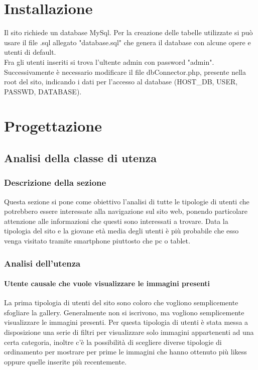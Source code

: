 \documentclass[openany, a4paper, 12pt]{report}
\begin{document}
	\chapter{Installazione}
	Il sito richiede un database MySql. Per la creazione delle tabelle utilizzate si può usare il file .sql allegato "database.sql" che genera il database con alcune opere e utenti di default.\\
	Fra gli utenti inseriti si trova l'ultente admin con password "admin".
	Successivamente è necessario modificare il file dbConnector.php, presente nella root del sito, indicando i dati per l'accesso al database (HOST\_DB, USER, PASSWD, DATABASE).\\
	
	\chapter{Progettazione}

	\section{Analisi della classe di utenza}

		\subsection{Descrizione della sezione}
		Questa sezione si pone come obiettivo l'analisi di tutte le tipologie di utenti che potrebbero essere interessate alla navigazione sul sito web, ponendo particolare attenzione alle informazioni che questi sono interessati a trovare. Data la tipologia del sito e la giovane età media degli utenti è più probabile che esso venga visitato tramite smartphone piuttosto che pc o tablet.\\
		\subsection{Analisi dell'utenza}
		\subsubsection{Utente causale che vuole visualizzare le immagini presenti}
		La prima tipologia di utenti del sito sono coloro che vogliono semplicemente sfogliare la gallery. Generalmente non si iscrivono, ma vogliono semplicemente visualizzare le immagini presenti.
		Per questa tipologia di utenti è stata messa a disposizione una serie di filtri per visualizzare solo immagini appartenenti ad una certa categoria, inoltre c'è la possibilità di scegliere diverse tipologie di ordinamento per mostrare per prime le immagini che hanno ottenuto più likess oppure quelle inserite più recentemente.\\
\end{document}

